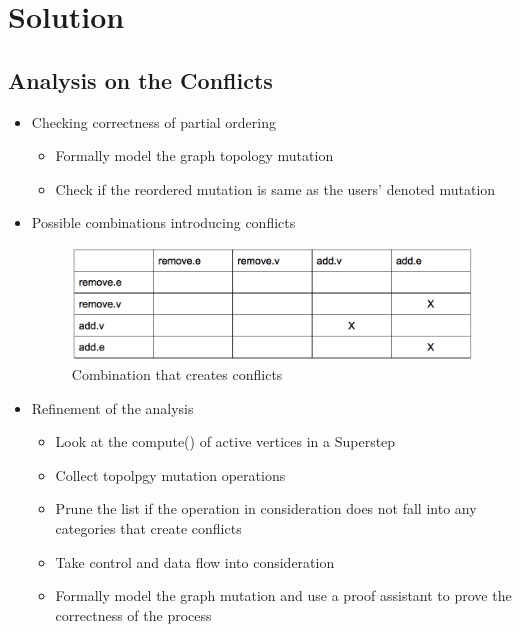 \section{Solution}

\subsection{Analysis on the Conflicts}

\begin{frame}
	\begin{itemize}
		\item Checking correctness of partial ordering	
		\linebreak
		\begin{itemize}
			\item Formally model the graph topology mutation
			\linebreak
			\item Check if  the reordered mutation is same as the users' denoted mutation
		\end{itemize}
	\end{itemize}
\end{frame}

\begin{frame}
	\begin{itemize}
		\item Possible combinations introducing conflicts
		\linebreak
			\begin{figure}
			\includegraphics[width=0.8\linewidth]{Pictures/table.png}
			\caption{Combination that creates conflicts}
			\end{figure}
	\end{itemize}
\end{frame}

\begin{frame}	
		 \begin{itemize}
		      \item Refinement of the analysis
		      \linebreak
		   	  \begin{itemize}
				\item Look at the compute() of active vertices in a Superstep 
				\item Collect topolpgy mutation operations
				\item Prune the list if the operation in consideration does not fall into any categories that create conflicts
				\item Take control and data flow into consideration
				\item Formally model the graph mutation and use a proof assistant to prove the correctness of the process
		     	  \end{itemize}
		  \end{itemize}
\end{frame}


